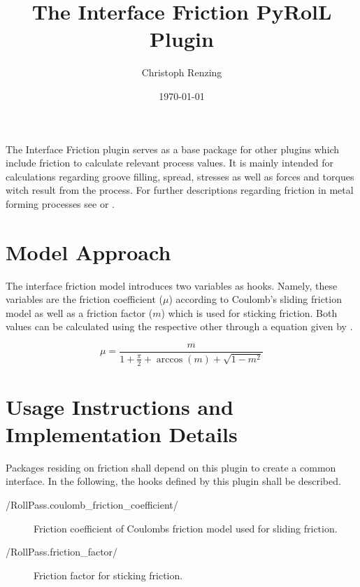 \documentclass[11pt]{PyRollDocs}
\begin{document}
    \title{The Interface Friction PyRolL Plugin}
    \author{Christoph Renzing}
    \date{\today}

    \maketitle

    The Interface Friction plugin serves as a base package for other plugins which include friction to calculate relevant process values.
    It is mainly intended for calculations regarding groove filling, spread, stresses as well as forces and torques witch result from the process.
    For further descriptions regarding friction in metal forming processes see \textcite{Black1993} or \textcite{Wilson1987}.


    \section{Model Approach}\label{sec:model-approach}

    The interface friction model introduces two variables as hooks.
    Namely, these variables are the friction coefficient ($\mu$) according to Coulomb's sliding friction model as well as a friction factor ($m$) which is used for sticking friction.
    Both values can be calculated using the respective other through a equation given by \textcite{Wanheim1974}.

    \begin{equation}
        \mu = \frac{m}{1 + \frac{\pi}{2} + \arccos\left( m \right) + \sqrt{1 - m ^2}}
        \label{eq:friction-coefficient-factor}
    \end{equation}


    \section{Usage Instructions and Implementation Details}\label{sec:usage-instructions}

    Packages residing on friction shall depend on this plugin to create a common interface.
    In the following, the hooks defined by this plugin shall be described.

    \begin{description}
        \item[\py/RollPass.coulomb_friction_coefficient/] Friction coefficient of Coulombs friction model used for sliding friction.
        \item[\py/RollPass.friction_factor/] Friction factor for sticking friction.
    \end{description}

    \printbibliography
\end{document}
